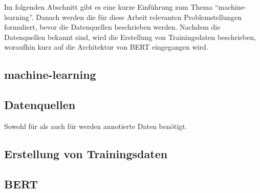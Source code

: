 Im folgenden Abschnitt gibt es eine kurze Einführung zum Thema \enquote{\gls{machine-learning}}. %
Danach werden die für diese Arbeit relevanten Problemstellungen formuliert,
bevor die Datenquellen beschrieben werden.
Nachdem die Datenquellen bekannt sind,
wird die Erstellung von Trainingsdaten beschrieben,
woraufhin kurz auf die Architektur von \gls{BERT} eingegangen wird.


\subsection{\Gls{machine-learning}}


\subsection{}


\subsection{Datenquellen}


Sowohl für  als auch für 
werden annotierte Daten benötigt.

\subsection{Erstellung von Trainingsdaten}


\subsection{\gls{BERT}}


\FloatBarrier